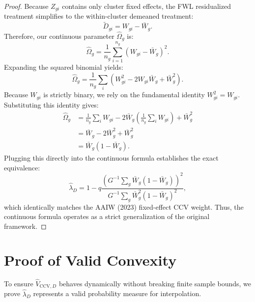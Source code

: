 \documentclass[11pt, letterpaper]{article}
\theoremstyle{remark}
\begin{document}
\begin{proof}
Because $Z_{gi}$ contains only cluster fixed effects, the FWL residualized treatment simplifies to the within-cluster demeaned treatment:
\begin{equation*}
    \widetilde D_{gi} = W_{gi} - \bar W_g.
\end{equation*}
Therefore, our continuous parameter $\widehat\Omega_g$ is:
\begin{equation*}
    \widehat\Omega_g = \frac{1}{n_g} \sum_{i=1}^{n_g} (W_{gi} - \bar W_g)^2.
\end{equation*}
Expanding the squared binomial yields:
\begin{equation*}
    \widehat\Omega_g = \frac{1}{n_g} \sum_i \left(W_{gi}^2 - 2W_{gi}\bar W_g + \bar W_g^2\right).
\end{equation*}
Because $W_{gi}$ is strictly binary, we rely on the fundamental identity $W_{gi}^2 = W_{gi}$. Substituting this identity gives:
\begin{align*}
    \widehat\Omega_g &= \frac{1}{n_g} \sum_i W_{gi} - 2\bar W_g \left( \frac{1}{n_g}\sum_i W_{gi} \right) + \bar W_g^2 \\
    &= \bar W_g - 2\bar W_g^2 + \bar W_g^2 \\
    &= \bar W_g(1-\bar W_g).
\end{align*}
Plugging this directly into the continuous formula establishes the exact equivalence:
\begin{equation*}
    \widehat\lambda_D = 1 - q \frac{\left(G^{-1}\sum_g \bar W_g(1-\bar W_g)\right)^2}{G^{-1}\sum_g \bar W_g^2(1-\bar W_g)^2},
\end{equation*}
which identically matches the AAIW (2023) fixed-effect CCV weight. Thus, the continuous formula operates as a strict generalization of the original framework.
\end{proof}

\section{Proof of Valid Convexity}

To ensure $\widehat V_{\text{CCV},D}$ behaves dynamically without breaking finite sample bounds, we prove $\widehat\lambda_D$ represents a valid probability measure for interpolation.
\end{document}
